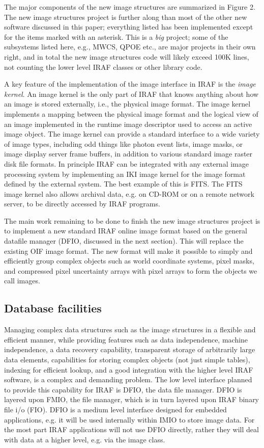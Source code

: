The major components of the new image structures are summarized in Figure
2.  The new image structures project is further along than most of the other
new software discussed in this paper; everything listed has been implemented
except for the items marked with an asterisk.  This is a {\it big} project;
some of the subsystems listed here, e.g., MWCS, QPOE etc., are major
projects in their own right, and in total the new image structures code
will likely exceed 100K lines, not counting the lower level IRAF classes
or other library code.

A key feature of the implementation of the image interface in IRAF is the
{\it image kernel}.  An image kernel is the only part of IRAF that knows
anything about how an image is stored externally, i.e., the physical image
format.  The image kernel implements a mapping between the physical image
format and the logical view of an image implemented in the runtime image
descriptor used to access an active image object.  The image kernel can
provide a standard interface to a wide variety of image types, including odd
things like photon event lists, image masks, or image display server frame
buffers, in addition to various standard image raster disk file formats.  In
principle IRAF can be integrated with any external image processing system
by implementing an IKI image kernel for the image format defined by the
external system.  The best example of this is FITS.  The FITS image kernel
also allows archival data, e.g. on CD-ROM or on a remote network server, to
be directly accessed by IRAF programs.

The main work remaining to be done to finish the new image structures
project is to implement a new standard IRAF online image format based on the
general datafile manager (DFIO, discussed in the next section).  This will
replace the existing OIF image format.  The new format will make it possible
to simply and efficiently group complex objects such as world coordinate
systems, pixel masks, and compressed pixel uncertainty arrays with pixel
arrays to form the objects we call images.

\subsection {Database facilities}

Managing complex data structures such as the image structures in a flexible
and efficient manner, while providing features such as data independence,
machine independence, a data recovery capability, transparent storage of
arbitrarily large data elements, capabilities for storing complex objects
(not just simple tables), indexing for efficient lookup, and a good
integration with the higher level IRAF software, is a complex and demanding
problem.  The low level interface planned to provide this capability for
IRAF is DFIO, the data file manager.  DFIO is layered upon FMIO, the file
manager, which is in turn layered upon IRAF binary file i/o (FIO).  DFIO is
a medium level interface designed for embedded applications, e.g. it will
be used internally within IMIO to store image data.  For the most part IRAF
applications will not use DFIO directly, rather they will deal with data at
a higher level, e.g. via the image class.

